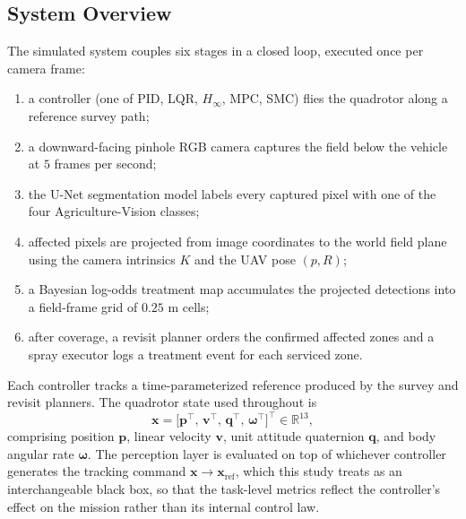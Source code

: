 \documentclass[12pt,a4paper]{article}
\begin{document}
\subsection{System Overview}
The simulated system couples six stages in a closed loop, executed once per camera
frame:
\begin{enumerate}[label=(\arabic*)]
    \item a controller (one of PID, LQR, $H_\infty$, MPC, SMC) flies the quadrotor
          along a reference survey path;
    \item a downward-facing pinhole RGB camera captures the field below the vehicle
          at $5$ frames per second;
    \item the U-Net segmentation model labels every captured pixel with one of the
          four Agriculture-Vision classes;
    \item affected pixels are projected from image coordinates to the world field
          plane using the camera intrinsics $K$ and the UAV pose $(p,R)$;
    \item a Bayesian log-odds treatment map accumulates the projected detections
          into a field-frame grid of $0.25$ m cells;
    \item after coverage, a revisit planner orders the confirmed affected zones and
          a spray executor logs a treatment event for each serviced zone.
\end{enumerate}
Each controller tracks a time-parameterized reference produced by the survey and revisit
planners. The quadrotor state used throughout is
\begin{equation}
    \mathbf{x} = \big[\mathbf{p}^{\top},\,\mathbf{v}^{\top},\,\mathbf{q}^{\top},\,\bm{\omega}^{\top}\big]^{\top} \in \mathbb{R}^{13},
    \label{eq:state}
\end{equation}
comprising position $\mathbf{p}$, linear velocity $\mathbf{v}$, unit attitude quaternion
$\mathbf{q}$, and body angular rate $\bm{\omega}$. The perception layer is evaluated on
top of whichever controller generates the tracking command $\mathbf{x}\!\to\!\mathbf{x}_{\mathrm{ref}}$,
which this study treats as an interchangeable black box, so that the task-level metrics
reflect the controller's effect on the mission rather than its internal control law.
\end{document}
